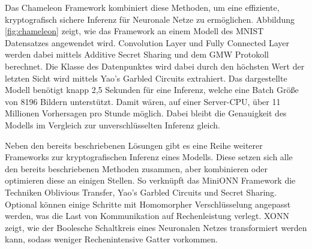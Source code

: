 Das Chameleon Framework kombiniert diese Methoden, um eine effiziente, kryptografisch sichere Inferenz für Neuronale Netze zu ermöglichen. Abbildung \ref{fig:chameleon} zeigt, wie das Framework an einem Modell des MNIST Datensatzes \cite{D-MNIST} angewendet wird.
Convolution Layer und Fully Connected Layer werden dabei mittels Additive Secret Sharing und dem GMW Protokoll berechnet.
Die Klasse des Datenpunktes wird dabei durch den höchsten Wert der letzten Sicht wird mittels Yao's Garbled Circuits extrahiert.
Das dargestellte Modell benötigt knapp 2,5 Sekunden für eine Inferenz, welche eine Batch Größe von 8196 Bildern unterstützt.
Damit wären, auf einer Server-CPU, über 11 Millionen Vorhersagen pro Stunde möglich.
Dabei bleibt die Genauigkeit des Modells im Vergleich zur unverschlüsselten Inferenz gleich.

Neben den bereits beschriebenen Lösungen gibt es eine Reihe weiterer Frameworks zur kryptografischen Inferenz eines Modells. 
Diese setzen sich alle den bereits beschriebenen Methoden zusammen, aber kombinieren oder optimieren diese an einigen Stellen.
So verknüpft das MiniONN Framework \cite{P-59} die Techniken Oblivious Transfer, Yao's Garbled Circuits und Secret Sharing. 
Optional können einige Schritte mit Homomorpher Verschlüsselung angepasst werden, was die Last von Kommunikation auf Rechenleistung verlegt.
XONN \cite{P-106} zeigt, wie der Boolesche Schaltkreis eines Neuronalen Netzes transformiert werden kann, sodass weniger Rechenintensive Gatter vorkommen.
